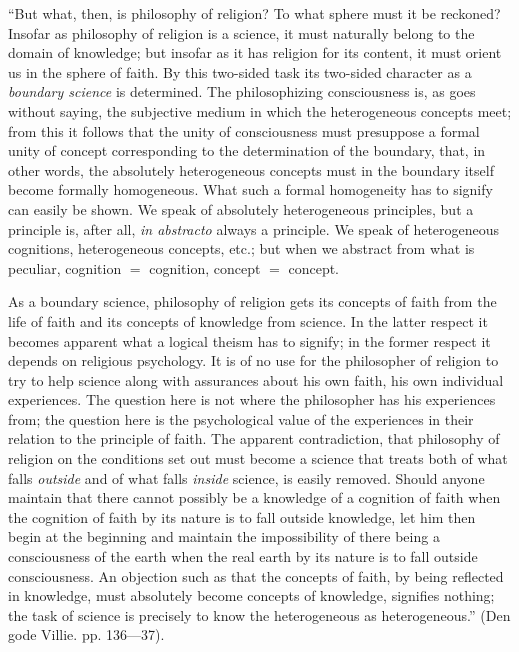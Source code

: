 \documentclass[12pt]{book}
\newcommand{\opage}[1]{\marginnote{\footnotesize\textit{[#1]}}}
\begin{document}
``But what, then, is philosophy of religion? To what sphere must it be
reckoned? Insofar as philosophy of religion is a science, it must naturally
belong to the domain of knowledge; but insofar as it has religion for its
\opage{254}\setcounter{footnote}{0}%
content, it must orient us in the sphere of faith. By this two-sided task its
two-sided character as a \emph{boundary science} is determined. The
philosophizing consciousness is, as goes without saying, the subjective
medium in which the heterogeneous concepts meet; from this it follows that the
unity of consciousness must presuppose a formal unity of concept corresponding
to the determination of the boundary, that, in other words, the absolutely
heterogeneous concepts must in the boundary itself become formally
homogeneous. What such a formal homogeneity has to signify can easily be
shown. We speak of absolutely heterogeneous principles, but a principle is,
after all, \textit{in abstracto} always a principle. We speak of heterogeneous
cognitions, heterogeneous concepts, etc.; but when we abstract from what is
peculiar, cognition $=$ cognition, concept $=$ concept.

As a boundary science, philosophy of religion gets its concepts of faith from
the life of faith and its concepts of knowledge from science. In the latter
respect it becomes apparent what a logical theism has to signify; in the
former respect it depends on religious psychology. It is of no use for the
philosopher of religion to try to help science along with assurances about his
own faith, his own individual experiences. The question here is not where the
philosopher has his experiences from; the question here is the psychological
value of the experiences in their relation to the principle of faith. The
apparent contradiction, that philosophy of religion on the conditions set out
must become a science that treats both of what falls \emph{outside} and of
what falls \emph{inside} science, is easily removed. Should anyone maintain
that there cannot possibly be a knowledge of a cognition of faith when the
cognition of faith by its nature is to fall outside knowledge, let him then
begin at the beginning and maintain the impossibility of there being a
\opage{255}\setcounter{footnote}{0}%
consciousness of the earth when the real earth by its nature is to fall
outside consciousness. An objection such as that the concepts of faith, by
being reflected in knowledge, must absolutely become concepts of knowledge,
signifies nothing; the task of science is precisely to know the heterogeneous
as heterogeneous.'' (Den gode Villie. pp. 136---37).
\end{document}
